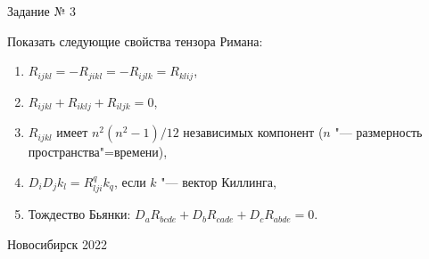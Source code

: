 \documentclass[12pt,pagesize,paper=192mm:108mm,landscape]{scrbook}
\begin{document}
\begin{titlepage}
  \vspace*{-0.5em}
  \begin{center}    




    \vfill
    \Large
    Задание № 3
    \bigskip

    \normalsize
    \begin{minipage}{0.65\linewidth}
Показать следующие свойства тензора Римана:
\begin{enumerate}
\item $R_{ijkl}=-R_{jikl}=-R_{ijlk}=R_{klij}$, 
\item  $R_{ijkl}+R_{iklj}+R_{iljk}=0$, 
\item  $R_{ijkl}$ имеет $n^2(n^2-1)/12$ независимых компонент ($n$ "--- размерность
  пространства"=времени), 
\item  $D_iD_jk_l=R_{lji}^qk_q$, если $k$ "--- вектор Киллинга,
\item Тождество Бьянки: $D_aR_{bcde}+D_bR_{cade}+D_cR_{abde}=0$.
\end{enumerate}
    \end{minipage}
    \vfill

    \normalsize \ccbysa\hspace{0.5em}  Новосибирск 2022
  \end{center}
\end{titlepage}
\end{document}
